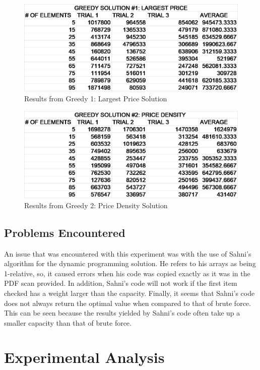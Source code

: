 \documentclass[onecolumn, letterpaper, 12pt]{article}
\begin{document}
\begin{figure}[H]
\centering
\includegraphics[width=0.8\linewidth]{./largestPriceTable.png}
\caption{Results from Greedy 1: Largest Price Solution}
\label{fig:largestPriceResults}
\end{figure}

\begin{figure}[H]
\centering
\includegraphics[width=0.8\linewidth]{./priceDensityTable.png}
\caption{Results from Greedy 2: Price Density Solution}
\label{fig:priceDensityResults}
\end{figure}



\subsection{Problems Encountered}
An issue that was encountered with this experiment was with the use of Sahni's algorithm for the dynamic programming solution. He refers to his arrays as being 1-relative, so, it caused errors when his code was copied exactly as it was in the PDF scan provided. In addition, Sahni's code will not work if the first item checked has a weight larger than the capacity. Finally, it seems that Sahni's code does not always return the optimal value when compared to that of brute force. This can be seen because the results yielded by Sahni's code often take up a smaller capacity than that of brute force.

\section{Experimental Analysis}
\end{document}
